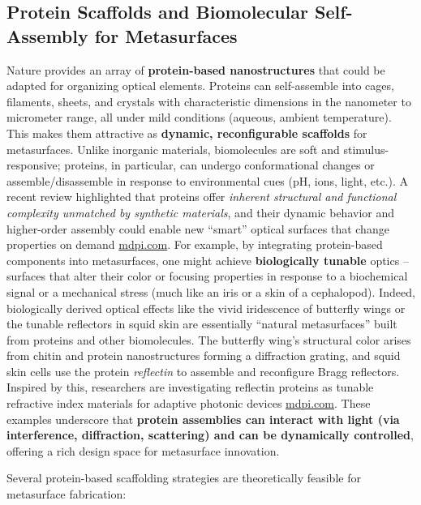 \documentclass[11pt,a4paper]{article}
\begin{document}
\subsection{Protein Scaffolds and Biomolecular Self-Assembly for Metasurfaces}

Nature provides an array of \textbf{protein-based nanostructures} that could be adapted for organizing optical elements. Proteins can self-assemble into cages, filaments, sheets, and crystals with characteristic dimensions in the nanometer to micrometer range, all under mild conditions (aqueous, ambient temperature). This makes them attractive as \textbf{dynamic, reconfigurable scaffolds} for metasurfaces. Unlike inorganic materials, biomolecules are soft and stimulus-responsive; proteins, in particular, can undergo conformational changes or assemble/disassemble in response to environmental cues (pH, ions, light, etc.). A recent review highlighted that proteins offer \emph{inherent structural and functional complexity unmatched by synthetic materials}, and their dynamic behavior and higher-order assembly could enable new ``smart'' optical surfaces that change properties on demand \href{https://www.mdpi.com/2079-6374/12/11/962#:~:text=diversify their optical properties%2C dielectric,a number of fascinating smart}{mdpi.com}. For example, by integrating protein-based components into metasurfaces, one might achieve \textbf{biologically tunable} optics -- surfaces that alter their color or focusing properties in response to a biochemical signal or a mechanical stress (much like an iris or a skin of a cephalopod). Indeed, biologically derived optical effects like the vivid iridescence of butterfly wings or the tunable reflectors in squid skin are essentially ``natural metasurfaces'' built from proteins and other biomolecules. The butterfly wing's structural color arises from chitin and protein nanostructures forming a diffraction grating, and squid skin cells use the protein \emph{reflectin} to assemble and reconfigure Bragg reflectors. Inspired by this, researchers are investigating reflectin proteins as tunable refractive index materials for adaptive photonic devices \href{https://www.mdpi.com/2079-6374/12/11/962#:~:text=photonic nanoscale architectures that can,mostly in determining the assembly}{mdpi.com}. These examples underscore that \textbf{protein assemblies can interact with light (via interference, diffraction, scattering) and can be dynamically controlled}, offering a rich design space for metasurface innovation.

Several protein-based scaffolding strategies are theoretically feasible for metasurface fabrication:
\end{document}

